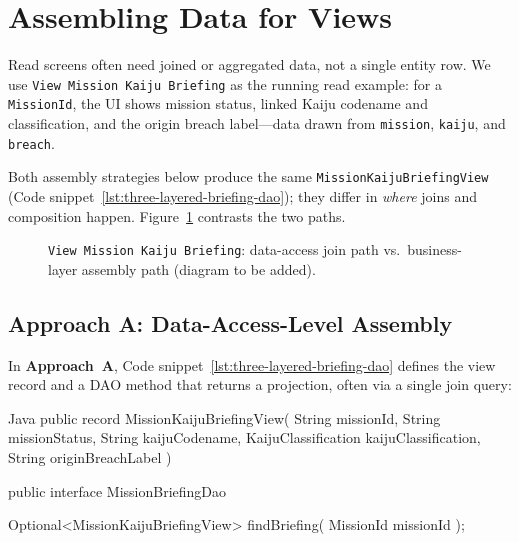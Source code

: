 \section{Assembling Data for Views}
\label{sec:three_layered_view_assembly}

Read screens often need joined or aggregated data, not a single entity row. We use \texttt{View Mission Kaiju Briefing} as the running read example: for a \texttt{MissionId}, the UI shows mission status, linked Kaiju codename and classification, and the origin breach label---data drawn from \texttt{mission}, \texttt{kaiju}, and \texttt{breach}.

Both assembly strategies below produce the same \texttt{MissionKaijuBriefingView} (Code snippet~\ref{lst:three-layered-briefing-dao}); they differ in \textit{where} joins and composition happen.\autocite{microsoft2003layered} Figure~\ref{fig:three_layered_briefing_assembly} contrasts the two paths.

\begin{figure}[htbp]
\centering
{}
\caption{\texttt{View Mission Kaiju Briefing}: data-access join path vs.\ business-layer assembly path (diagram to be added).}
\label{fig:three_layered_briefing_assembly}
\end{figure}

\subsection{Approach A: Data-Access-Level Assembly}
\label{sec:three_layered_view_assembly_persistence}

In \textbf{Approach~A}, Code snippet~\ref{lst:three-layered-briefing-dao} defines the view record and a DAO method that returns a projection, often via a single join query:

\begin{ridercode}{Java}
public record MissionKaijuBriefingView(
    String missionId,
    String missionStatus,
    String kaijuCodename,
    KaijuClassification kaijuClassification,
    String originBreachLabel
) {}

public interface MissionBriefingDao
{

    Optional<MissionKaijuBriefingView> findBriefing(
        MissionId missionId
    );

}
\end{ridercode}
\label{lst:three-layered-briefing-dao}

